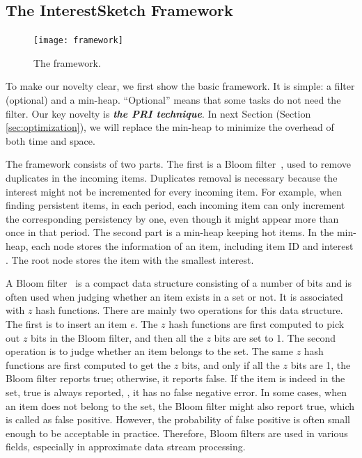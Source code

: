 \presub
\subsection{The InterestSketch Framework}
\postsub
\label{sub:findinterest}
%
\begin{figure}[htbp]
	\centering
	\prefig
	\texttt{[image: framework]}
	\prefigcaption \vspace{-0.05in} \vspace{-0.05in}
	\caption{The \aname{} framework.}
	\label{draw:interestframework}
	\postfig \vspace{-0.05in}
\end{figure}
%
To make our novelty clear, we first show the basic framework. It is simple: a filter (optional) and a min-heap. ``Optional'' means that some tasks do not need the filter.
%
Our key novelty is \textbf{\textit{the PRI technique}}.
%
In next Section (Section \ref{sec:optimization}), we will replace the min-heap to minimize the overhead of both time and space.


The \aname{} framework consists of two parts. The first is a Bloom filter~\cite{BF1970}, used to remove duplicates in the incoming items. 
%
Duplicates removal is necessary because the interest \ii might not be incremented for every incoming item. For example, when finding persistent items, in each period, each incoming item can only increment the corresponding persistency by one, even though it might appear more than once in that period. 
%
The second part is a min-heap keeping hot items. In the min-heap, each node stores the information of an item, including item ID and interest \ii. The root node stores the item with the smallest interest. 

A Bloom filter~\cite{BF1970} is a compact data structure consisting of a number of bits and is often used when judging whether an item exists in a set or not. 
%
It is associated with $z$ hash functions.
%
There are mainly two operations for this data structure. 
%
The first is to insert an item $e$. 
%
The $z$ hash functions are first computed to pick out $z$ bits in the Bloom filter, and then all the $z$ bits are set to 1.
%
The second operation is to judge whether an item belongs to the set. The same $z$ hash functions are first computed to get the $z$ bits, and only if all the $z$ bits are 1, the Bloom filter reports true; otherwise, it reports false.
%
If the item is indeed in the set, true is always reported, \ie, it has no false negative error. 
%
In some cases, when an item does not belong to the set, the Bloom filter might also report true, which is called as false positive. However, the probability of false positive is often small enough to be acceptable in practice. 
%
Therefore, Bloom filters are used in various fields, especially in approximate data stream processing.


